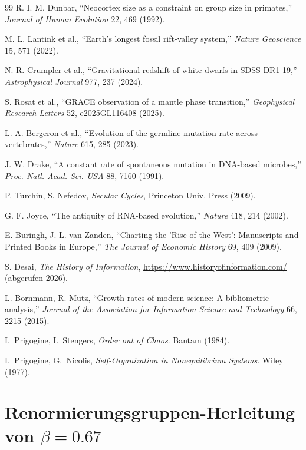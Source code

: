 \documentclass[12pt,a4paper]{article}
\theoremstyle{remark}
\begin{document}
\begin{thebibliography}{99}
		R. I. M. Dunbar, ``Neocortex size as a constraint on group size in primates,'' \emph{Journal of Human Evolution} 22, 469 (1992).
		
		M. L. Lantink et al., ``Earth's longest fossil rift-valley system,'' \emph{Nature Geoscience} 15, 571 (2022).
		
		N. R. Crumpler et al., ``Gravitational redshift of white dwarfs in SDSS DR1-19,'' \emph{Astrophysical Journal} 977, 237 (2024).
		
		S. Rosat et al., ``GRACE observation of a mantle phase transition,'' \emph{Geophysical Research Letters} 52, e2025GL116408 (2025).
		
		L. A. Bergeron et al., ``Evolution of the germline mutation rate across vertebrates,'' \emph{Nature} 615, 285 (2023).
		
		J. W. Drake, ``A constant rate of spontaneous mutation in DNA-based microbes,'' \textit{Proc. Natl. Acad. Sci. USA} 88, 7160 (1991).
		
		P. Turchin, S. Nefedov, \emph{Secular Cycles}, Princeton Univ. Press (2009).
		
		G. F. Joyce, ``The antiquity of RNA-based evolution,'' \textit{Nature} 418, 214 (2002).
		
		E. Buringh, J. L. van Zanden, ``Charting the 'Rise of the West': Manuscripts and Printed Books in Europe,'' \emph{The Journal of Economic History} 69, 409 (2009).
		
		S. Desai, \emph{The History of Information}, \url{https://www.historyofinformation.com/} (abgerufen 2026).
		
		L. Bornmann, R. Mutz, ``Growth rates of modern science: A bibliometric analysis,'' \emph{Journal of the Association for Information Science and Technology} 66, 2215 (2015).
		
		 I.~Prigogine, I.~Stengers, \emph{Order out of Chaos}. Bantam (1984).
		
		 I.~Prigogine, G.~Nicolis, \emph{Self‑Organization in Nonequilibrium Systems}. Wiley (1977).
		
	\end{thebibliography}
	
	\appendix
	
	\section{Renormierungsgruppen-Herleitung von $\beta = 0.67$}
	\label{app:rg}
	
\end{document}
